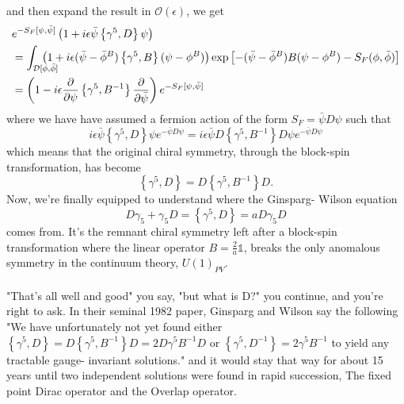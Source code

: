 \documentclass[a4paper,10pt]{article}
\begin{document}
and then expand the result in $\mathcal{O}(\epsilon)$, we get 
\begin{equation}
\begin{aligned} 
&e^{-S_F[\psi, \bar{\psi}]}\left(1+i \epsilon \bar{\psi}\left\{\gamma^{5}, D\right\} \psi\right)\\&=\int_{\mathcal{D}[\phi, \bar{\phi}]} \mkern-30mu\left(1+i \epsilon(\bar{\psi}-\bar{\phi}^B)\left\{\gamma^{5}, B\right\}(\psi-\phi^B)\right) \exp \left[-(\bar{\psi}-\bar{\phi}^B) B(\psi-\phi^B)-S_F(\phi, \bar{\phi})\right]\\
&=\left(1-i \epsilon \frac{\partial}{\partial\psi}\left\{\gamma^{5}, B^{-1}\right\} \frac{\partial}{\partial\bar{\psi}}\right)e^{-S_F[\psi, \bar{\psi}]}
\end{aligned}
\end{equation}
where we have have assumed a fermion action of the form $S_F=\bar{\psi} D \psi$ such that 
\begin{equation}
i \epsilon \bar{\psi}\left\{\gamma^{5}, D\right\} \psi e^{-\bar{\psi} D \psi}=i \epsilon \bar{\psi} D\left\{\gamma^{5}, B^{-1}\right\} D \psi e^{-\bar{\psi}D \psi}
\end{equation}
which means that the original chiral symmetry, through the block-spin transformation, has become 
\begin{equation}
\left\{\gamma^{5}, D\right\} = D\left\{\gamma^{5}, B^{-1}\right\}D.
\end{equation}
Now, we're finally equipped to understand where the Ginsparg- Wilson equation 
\begin{equation*}
D \gamma_{5}+\gamma_{5} D=\left\{\gamma^{5}, D\right\} =a D \gamma_{5} D
\end{equation*}
comes from. It's the remnant chiral symmetry left after a block-spin transformation where the linear operator $B=\frac{2}{a}\mathbb{1}$, breaks the only anomalous symmetry in the continuum theory, $U(1)_{PV}$.\\\\"That's all well and good" you say, "but what is D?" you continue, and you're right to ask. In their seminal 1982 paper\cite{GinspargPaulH1982Aroc}, Ginsparg and Wilson say the following "We have unfortunately not yet found either $\left\{\gamma^{5}, D\right\}=D\left\{\gamma^{5}, B^{-1}\right\} D=2D\gamma^5B^{-1}D$ or $\left\{\gamma^{5}, D^{-1}\right\}=2 \gamma^{5} B^{-1}$ to yield any tractable gauge- invariant solutions." and it would stay that way for about 15 years until two independent solutions were found in rapid succession, The fixed point Dirac operator\cite{HASENFRATZ199853} and the Overlap operator\cite{PhysRevLett.81.4060}.
\end{document}
